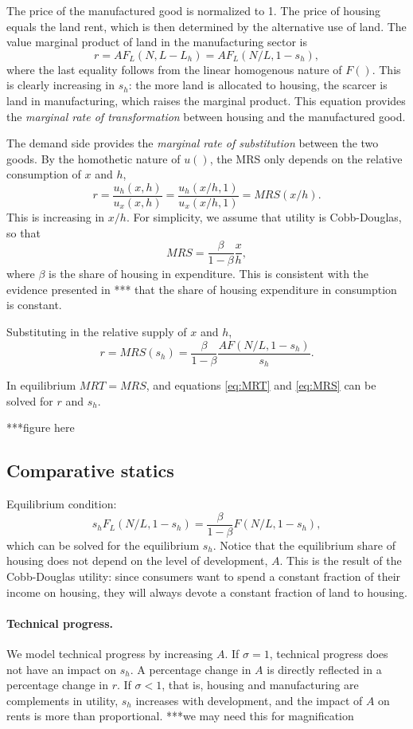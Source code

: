 \documentclass[12pt]{article}
\begin{document}
The price of the manufactured good is normalized to 1. The price of housing equals the land rent, which is then determined by the alternative use of land. The value marginal product of land in the manufacturing sector is
\begin{equation}\label{eq:MRT}
r = AF_L(N,L-L_h) = AF_L(N/L,1-s_h),
\end{equation}
where the last equality follows from the linear homogenous nature of $F()$. This is clearly increasing in $s_h$: the more land is allocated to housing, the scarcer is land in manufacturing, which raises the marginal product. This equation provides the \emph{marginal rate of transformation} between housing and the manufactured good.

The demand side provides the \emph{marginal rate of substitution} between the two goods. By the homothetic nature of $u()$, the MRS only depends on the relative consumption of $x$ and $h$,
\[
r = \frac{u_h(x,h)}{u_x(x,h)} = \frac{u_h(x/h,1)}{u_x(x/h,1)} = MRS(x/h).
\]
This is increasing in $x/h$. For simplicity, we assume that utility is Cobb-Douglas, so that
\[
MRS = \frac{\beta}{1-\beta}\frac{x}{h},
\]
where $\beta$ is the share of housing in expenditure. This is consistent with the evidence presented in *** that the share of housing expenditure in consumption is constant.

Substituting in the relative supply of $x$ and $h$,
\begin{equation}\label{eq:MRS}
r = MRS(s_h) = \frac{\beta}{1-\beta}\frac{AF(N/L,1-s_h)}{s_h}.
\end{equation}

In equilibrium $MRT=MRS$, and equations \eqref{eq:MRT} and \eqref{eq:MRS} can be solved for $r$ and $s_h$.

***figure here

\subsection{Comparative statics}
Equilibrium condition:
\[
{s_hF_L(N/L,1-s_h)} = \frac{\beta}{1-\beta}F(N/L,1-s_h),
\]
which can be solved for the equilibrium $s_h$. Notice that the equilibrium share of housing does not depend on the level of development, $A$. This is the result of the Cobb-Douglas utility: since consumers want to spend a constant fraction of their income on housing, they will always devote a constant fraction of land to housing.

\paragraph{Technical progress.} We model technical progress by increasing $A$. If $\sigma=1$, technical progress does not have an impact on $s_h$. A percentage change in $A$ is directly reflected in a percentage change in $r$. If $\sigma<1$, that is, housing and manufacturing are complements in utility, $s_h$ increases with development, and the impact of $A$ on rents is more than proportional. ***we may need this for magnification
\end{document}
